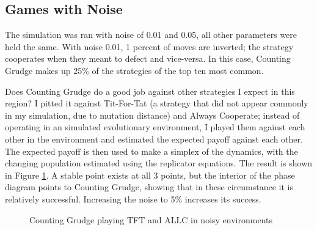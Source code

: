 \documentclass[a4paper,11pt,bcshonoursthesis,singlespace,oneside,thesisdraft,pdflatex]{cssethesis}
\begin{document}
\subsection{Games with Noise}
\label{sec:noise}
The simulation was ran with noise of 0.01 and 0.05, all other parameters were held the same. 
With noise 0.01, 1 percent of moves are inverted; the strategy cooperates when they meant to defect and vice-versa. 
In this case, Counting Grudge makes up 25\% of the strategies of the top ten most common. 

Does Counting Grudge do a good job against other strategies I expect in this region? 
I pitted it against Tit-For-Tat (a strategy that did not appear commonly in my simulation, due to mutation distance) and Always Cooperate; instead of operating in an simulated evolutionary environment, I played them against each other in the environment and estimated the expected payoff against each other. 
The expected payoff is then used to make a simplex of the dynamics, with the changing population estimated using the replicator equations. 
The result is shown in Figure \ref{fig:noisesimplex}. 
A stable point exists at all 3 points, but the interior of the phase diagram points to Counting Grudge, showing that in these circumstance it is relatively successful. Increasing the noise to 5\% increases its success. 

\begin{figure}[h!]
\caption{Counting Grudge playing TFT and ALLC in noisy environments}
\label{fig:noisesimplex}
\end{figure}
\end{document}
